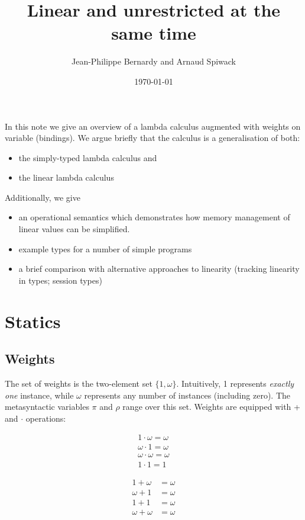 \documentclass[11pt]{article}
\author{Jean-Philippe Bernardy and Arnaud Spiwack}
\date{\today}
\title{Linear and unrestricted at the same time}
\begin{document}
\maketitle

\bigskip

In this note we give an overview of a lambda calculus augmented with
weights on variable (bindings). We argue briefly that the calculus is
a generalisation of both:
\begin{itemize}
\item the simply-typed lambda calculus and
\item the linear lambda calculus
\end{itemize}

Additionally, we give
\begin{itemize}
\item an operational semantics which demonstrates how memory
  management of linear values can be simplified.
\item example types for a number of simple programs
\item a brief comparison with alternative approaches to linearity
  (tracking linearity in types; session types)
\end{itemize}

\section{Statics}
\label{sec:orgheadline8}
\subsection{Weights}
\label{sec:orgheadline1}

The set of weights is the two-element set $\{1,ω\}$. Intuitively, 1
represents \emph{exactly one} instance, while $ω$ represents any number of
instances (including zero).  The metasyntactic variables \(π\) and \(ρ\)
range over this set. Weights are equipped with + and $·$ operations:


\begin{align*}
1 · ω = ω \\
ω · 1 = ω \\
ω · ω = ω \\
1 · 1 = 1
\end{align*}

\begin{align*}
1 + ω &= ω \\
ω + 1 &= ω \\
1 + 1 &= ω \\
ω + ω &= ω
\end{align*}
\end{document}
